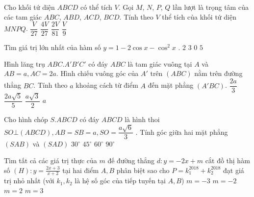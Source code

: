 \begin{ex}%
	Cho khối tứ diện $ABCD$ có thể tích $V$. Gọi $M$, $N$, $P$, $Q$ lần lượt là trọng tâm của các tam giác $ABC$, $ABD$, $ACD$, $BCD$. Tính theo $V$ thể tích của khối tứ diện $MNPQ$.
	\choice
	{\True $\dfrac{V}{27}$}
	{$\dfrac{4V}{27}$}
	{$\dfrac{2V}{81}$}
	{$\dfrac{V}{9}$}

\end{ex}
\begin{ex} %
Tìm giá trị lớn nhất của hàm số $y=1 - 2 \cos x - \cos^2 x$ .
\choice
{\True $2$}
{$3$}
{$0$}
{$5$}
\end{ex}
\begin{ex} %
Hình lăng trụ $ABC.A'B'C'$  có đáy $ABC$ là tam giác vuông tại $A $ và $AB=a,AC=2a$.  Hình chiếu vuông góc của $A'$  trên $(ABC)$ nằm trên đường thẳng $BC$. Tính theo $a$ khoảng cách từ điểm $A$  đến mặt phẳng $(A'BC)$.
\choice
{$\dfrac{2a}{3}$}
{\True $\dfrac{2a\sqrt{5}}{5}$}
{$\dfrac{a\sqrt{3}}{2}$}
{$a$}
\end{ex}
\begin{ex}%
Cho hình chóp $S.ABCD$ có đáy $ABCD$ là hình thoi $SO\bot \left(ABCD\right),AB=SB=a,SO=\dfrac{a\sqrt{6}}{3}$ . Tính góc giữa hai mặt phẳng $\left(SAB\right)$ và $\left(SAD\right)$
\choice
{$30^\circ $}
{$45^ \circ$}
{$60^\circ $}
{\True $90^\circ $}
\end{ex}
\begin{ex}%
Tìm tất cả các giá trị thực của $m$ đế đường thẳng $d:y=-2x+m$ cắt đồ thị hàm số $\left(H\right):y=\frac{2x+3}{x+2}$ tại hai điểm $A,B$ phân biệt sao cho $P=k_{1}^{2018}+k_{2}^{2018}$ đạt giá trị nhỏ nhất (với $k_1,k_2$ là hệ số góc của tiếp tuyến tại $A,B$)
\choice
{$m=-3$}
{\True $m=-2$}
{$m=2$}
{$m=3$}
\end{ex}
